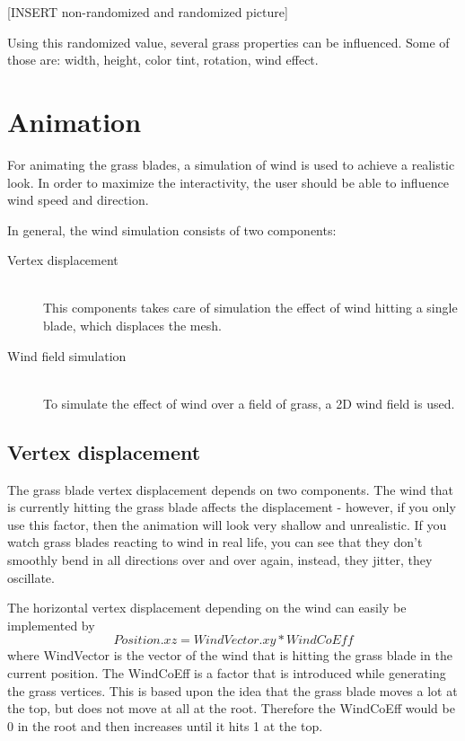 \documentclass[conference]{acmsiggraph}
\begin{document}
[INSERT non-randomized and randomized picture]

Using this randomized value, several grass properties can be influenced. Some of those are: width, height, color tint, rotation, wind effect.

\section{Animation}
For animating the grass blades, a simulation of wind is used to achieve a realistic look. In order to maximize the interactivity, the user should be able to influence wind speed and direction. 

In general, the wind simulation consists of two components:

\begin{description}
  \item[Vertex displacement] \hfill \\
  This components takes care of simulation the effect of wind hitting a single blade, which displaces the mesh.
  \item[Wind field simulation] \hfill \\
  To simulate the effect of wind over a field of grass, a 2D wind field is used.
\end{description}

\subsection{Vertex displacement}
The grass blade vertex displacement depends on two components. The wind that is currently hitting the grass blade affects the displacement - however, if you only use this factor, then the animation will look very shallow and unrealistic. If you watch grass blades reacting to wind in real life, you can see that they don't smoothly bend in all directions over and over again, instead, they jitter, they oscillate.

The horizontal vertex displacement depending on the wind can easily be implemented by
\begin{equation}
Position.xz = WindVector.xy * WindCoEff
\end{equation}
where WindVector is the vector of the wind that is hitting the grass blade in the current position. The WindCoEff is a factor that is introduced while generating the grass vertices. This is based upon the idea that the grass blade moves a lot at the top, but does not move at all at the root. Therefore the WindCoEff would be 0 in the root and then increases until it hits 1 at the top.
\end{document}
